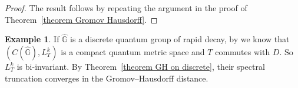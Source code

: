 \documentclass[12pt, reqno]{amsart}
\theoremstyle{definition}
\newtheorem{example}[theorem]{Example}
\theoremstyle{remark}
\numberwithin{equation}{section}
\begin{document}
\begin{proof}
    The result follows by repeating the argument in the proof of 
    Theorem~\ref{theorem Gromov Hausdorff}.
\end{proof}

\begin{example}
    If $\hat{\mathbb{G}}$ is a discrete quantum group of rapid decay, by \cite{20} we know that $(C(\hat{\mathbb{G}}), L_T^k)$ is 
    a compact quantum metric space and $T$ commutes with $D$. So $L_T^k$ is 
    bi-invariant. By Theorem~\ref{theorem GH on discrete}, their spectral 
    truncation converges in the Gromov--Hausdorff distance.
\end{example}
\end{document}
